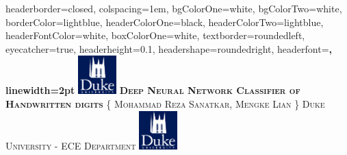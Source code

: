 \documentclass[landscape,a0paper,fontscale=0.285]{baposter} %
\begin{document}
\begin{poster}
{
headerborder=closed, %
colspacing=1em, %
bgColorOne=white, %
bgColorTwo=white, %
borderColor=lightblue, %
headerColorOne=black, %
headerColorTwo=lightblue, %
headerFontColor=white, %
boxColorOne=white, %
textborder=roundedleft, %
eyecatcher=true, %
headerheight=0.1\textheight, %
headershape=roundedright, %
headerfont=\Large\bf\textsc, %
linewidth=2pt %
}
%
{\includegraphics[height=4em]{logo.png}} %
{\bf\textsc{Deep Neural Network Classifier of Handwritten digits}\vspace{0.5em}} %
{\textsc{\{ Mohammad Reza Sanatkar, Mengke Lian \} \hspace{12pt} Duke University - ECE Department}} %
{\includegraphics[height=4em]{logo.png}} %



\end{poster}
\end{document}
